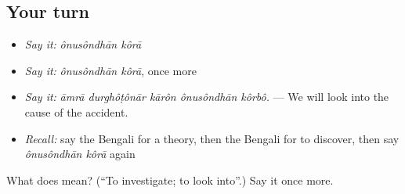 \subsection*{Your turn}
\begin{itemize}
\raggedright
  \item \emph{Say it:} \emph{ônusôndhān kôrā}
  \item \emph{Say it:} \emph{ônusôndhān kôrā}, once more
  \item \emph{Say it:} \emph{āmrā durghôṭônār kārôn ônusôndhān kôrbô.} — We will look into the cause of the accident.
  \item \emph{Recall:} say the Bengali for a theory, then the Bengali for to discover, then say \emph{ônusôndhān kôrā} again
\end{itemize}

\begin{tcolorbox}[breakable,colback=teal!4,colframe=teal!35!black,title={Before you move on}]
What does   mean? (\textquotedblleft{}To investigate; to look into\textquotedblright{}.) Say it once more.
\end{tcolorbox}
